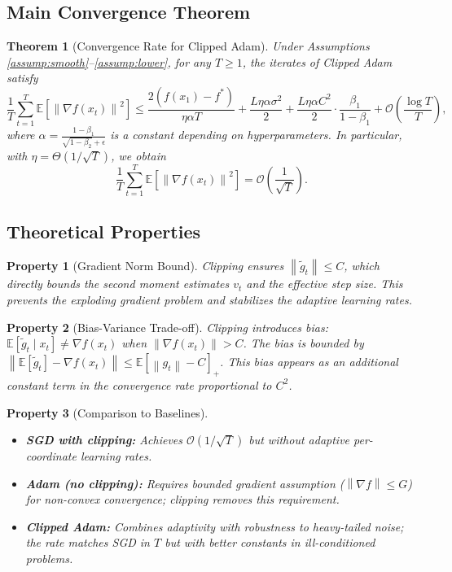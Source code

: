 \documentclass{article}
\newtheorem{theorem}{Theorem}
\newtheorem{property}{Property}
\newcommand{\E}{\mathbb{E}}
\newcommand{\norm}[1]{\left\| #1 \right\|}
\begin{document}
\subsection*{Main Convergence Theorem}
\begin{theorem}[Convergence Rate for Clipped Adam] \label{thm:main}
    Under Assumptions \ref{assump:smooth}--\ref{assump:lower}, for any $T \ge 1$, the iterates of Clipped Adam satisfy
    \[
        \frac{1}{T} \sum_{t=1}^T \E\left[ \norm{\nabla f(x_t)}^2 \right]
        \le \frac{2(f(x_1)-f^*)}{\eta \alpha T} + \frac{L \eta \alpha \sigma^2}{2} + \frac{L \eta \alpha C^2}{2} \cdot \frac{\beta_1}{1-\beta_1} + \mathcal{O}\left(\frac{\log T}{T}\right),
    \]
    where $\alpha = \frac{1-\beta_1}{\sqrt{1-\beta_2} + \epsilon}$ is a constant depending on hyperparameters. In particular, with $\eta = \Theta(1/\sqrt{T})$, we obtain
    \[
        \frac{1}{T} \sum_{t=1}^T \E\left[ \norm{\nabla f(x_t)}^2 \right] = \mathcal{O}\left(\frac{1}{\sqrt{T}}\right).
    \]
\end{theorem}

\subsection*{Theoretical Properties}
\begin{property}[Gradient Norm Bound]
    Clipping ensures $\norm{\tilde{g}_t} \le C$, which directly bounds the second moment estimates $v_t$ and the effective step size. This prevents the exploding gradient problem and stabilizes the adaptive learning rates.
\end{property}

\begin{property}[Bias-Variance Trade-off]
    Clipping introduces bias: $\E[\tilde{g}_t \mid x_t] \neq \nabla f(x_t)$ when $\norm{\nabla f(x_t)} > C$. The bias is bounded by $\norm{\E[\tilde{g}_t] - \nabla f(x_t)} \le \E[\norm{g_t} - C]_+$. This bias appears as an additional constant term in the convergence rate proportional to $C^2$.
\end{property}

\begin{property}[Comparison to Baselines]
    \begin{itemize}
        \item \textbf{SGD with clipping:} Achieves $\mathcal{O}(1/\sqrt{T})$ but without adaptive per-coordinate learning rates.
        \item \textbf{Adam (no clipping):} Requires bounded gradient assumption ($\norm{\nabla f} \le G$) for non-convex convergence; clipping removes this requirement.
        \item \textbf{Clipped Adam:} Combines adaptivity with robustness to heavy-tailed noise; the rate matches SGD in $T$ but with better constants in ill-conditioned problems.
    \end{itemize}
\end{property}
\end{document}
